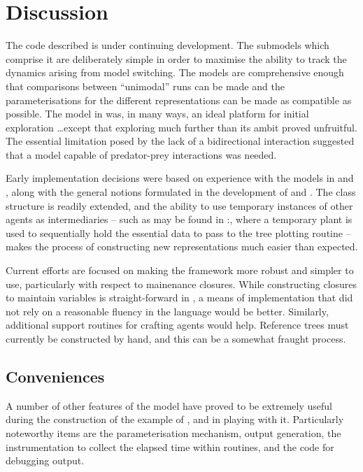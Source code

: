 \section{Discussion}

The code described is under continuing development. The submodels
which comprise it are deliberately simple in order to maximise the
ability to track the dynamics arising from model switching.  The
models are comprehensive enough that comparisons between ``unimodal''
runs can be made and the parameterisations for the different
representations can be made as compatible as possible.  The model
in \Ctwo was, in many ways, an ideal platform for initial
exploration \ldots except that exploring much further than its ambit
proved unfruitful.  The essential limitation posed by the lack of a
bidirectional interaction suggested that a model capable of
predator-prey interactions was needed.

Early implementation decisions were based on experience with the
models in \cite{lyne1994pmez5,gray2006nws} and \cite{grayningaloo},
along with the general notions formulated in the development
of \Ctwo and \Cthree. The class structure is readily extended, and the
ability to use temporary instances of other agents as intermediaries
-- such as may be found in :, where
a temporary plant is used to sequentially hold the essential data to
pass to the tree plotting routine -- makes the process of constructing
new representations much easier than expected.

Current efforts are focused on making the framework more robust and
simpler to use, particularly with respect to mainenance
closures. While constructing closures to maintain variables is
straight-forward in \Scheme, a means of implementation that did not
rely on a reasonable fluency in the language would be better.
Similarly, additional support routines for crafting 
agents would help. Reference trees must currently be constructed by
hand, and this can be a somewhat fraught process.


\subsection{Conveniences}
A number of other features of the model have proved to be extremely
useful during the construction of the example of \Cthree, and in playing with
it. Particularly noteworthy items are the parameterisation mechanism,
output generation, the instrumentation to collect the elapsed time
within routines, and the code for debugging output.

